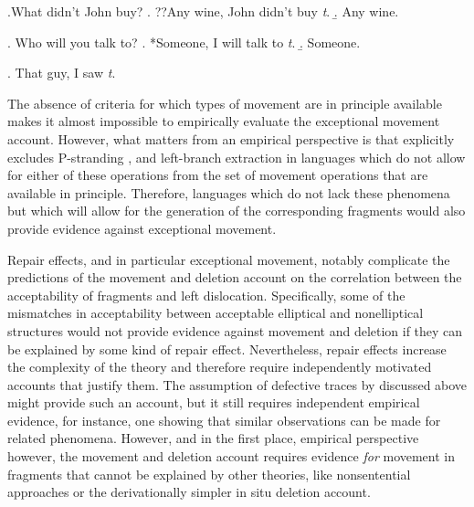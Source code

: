 \ex.What didn't John buy? \hfill \citep[adapted from][3]{weir2015}
\a. ??Any wine, John didn't buy \textit{t}.
\b. Any wine.

\ex. Who will you talk to? \hfill \citep[adapted from][3]{weir2015}
\a. *Someone, I will talk to \textit{t}.
\b. Someone.

\ex. That guy, I saw \textit{t}.\label{ex:weir-fronting}  \hfill \citep[10]{weir2015} 

The absence of criteria for which types of movement are in principle available makes it almost impossible to empirically evaluate the exceptional movement account. However, what matters from an empirical perspective is that \citet[11]{weir2015} explicitly excludes P-stranding \citep{pullum.huddleston2002}, and left-branch extraction \citep{ross1967, boskovic2005} in languages which do not allow for either of these operations from the set of movement operations that are available in principle. Therefore, languages which do not lack these phenomena but which will allow for the generation of the corresponding fragments would also provide evidence against exceptional movement.

Repair effects, and in particular exceptional movement, notably complicate the predictions of the movement and deletion account on the correlation between the acceptability of fragments and left dislocation. Specifically, some of the mismatches in acceptability between acceptable elliptical and nonelliptical structures would not provide evidence against movement and deletion if they can be explained by some kind of repair effect. Nevertheless, repair effects increase the complexity of the theory and therefore require independently motivated accounts that justify them. The assumption of defective traces by \citet{merchant2004} discussed above might provide such an account, but it still requires independent empirical evidence, for instance, one showing that similar observations can be made for related phenomena. However, and in the first place, empirical perspective however, the movement and deletion account requires evidence \textit{for} movement in fragments that cannot be explained by other theories, like nonsentential approaches or the derivationally simpler in situ deletion account.


